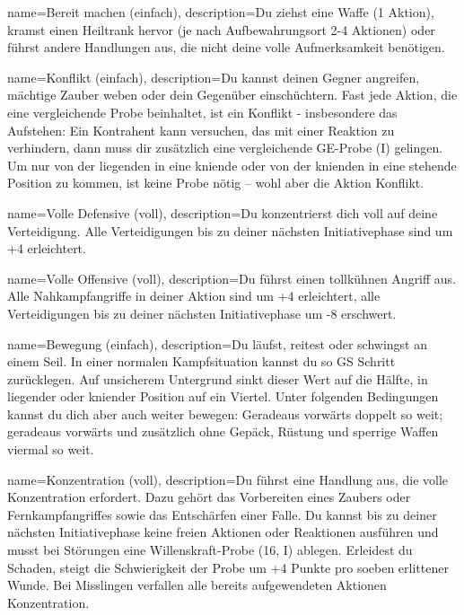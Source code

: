 {
    name={Bereit machen (einfach)},
    description={Du ziehst eine Waffe (1 Aktion), kramst einen Heiltrank hervor (je nach Aufbewahrungsort 2-4 Aktionen) oder führst andere Handlungen aus, die nicht deine volle Aufmerksamkeit benötigen.}
}


{
    name={Konflikt (einfach)},
    description={Du kannst deinen Gegner angreifen, mächtige Zauber weben oder dein Gegenüber einschüchtern. Fast jede Aktion, die eine vergleichende Probe beinhaltet, ist ein Konflikt - insbesondere das Aufstehen: Ein Kontrahent kann versuchen, das mit einer Reaktion zu verhindern, dann muss dir zusätzlich eine vergleichende GE-Probe (I) gelingen. Um nur von der liegenden in eine kniende oder von der knienden in eine stehende Position zu kommen, ist keine Probe nötig – wohl aber die Aktion Konflikt.}
}


{
    name={Volle Defensive (voll)},
    description={Du konzentrierst dich voll auf deine Verteidigung. Alle Verteidigungen bis zu deiner nächsten Initiativephase sind um +4 erleichtert.}
}


{
    name={Volle Offensive (voll)},
    description={Du führst einen tollkühnen Angriff aus. Alle Nahkampfangriffe in deiner Aktion sind um +4 erleichtert, alle Verteidigungen bis zu deiner nächsten Initiativephase um -8 erschwert.}
}


{
    name={Bewegung (einfach)},
    description={Du läufst, reitest oder schwingst an einem Seil. In einer normalen Kampfsituation kannst du so GS Schritt zurücklegen. Auf unsicherem Untergrund sinkt dieser Wert auf die Hälfte, in liegender oder kniender Position auf ein Viertel. Unter folgenden Bedingungen kannst du dich aber auch weiter bewegen: Geradeaus vorwärts doppelt so weit; geradeaus vorwärts und zusätzlich ohne Gepäck, Rüstung und sperrige Waffen viermal so weit.}
}


{
    name={Konzentration (voll)},
    description={Du führst eine Handlung aus, die volle Konzentration erfordert. Dazu gehört das Vorbereiten eines Zaubers oder Fernkampfangriffes sowie das Entschärfen einer Falle. Du kannst bis zu deiner nächsten Initiativephase keine freien Aktionen oder Reaktionen ausführen und musst bei Störungen eine Willenskraft-Probe (16, I) ablegen. Erleidest du Schaden, steigt die Schwierigkeit der Probe um +4 Punkte pro soeben erlittener Wunde. Bei Misslingen verfallen alle bereits aufgewendeten Aktionen Konzentration.}
}


